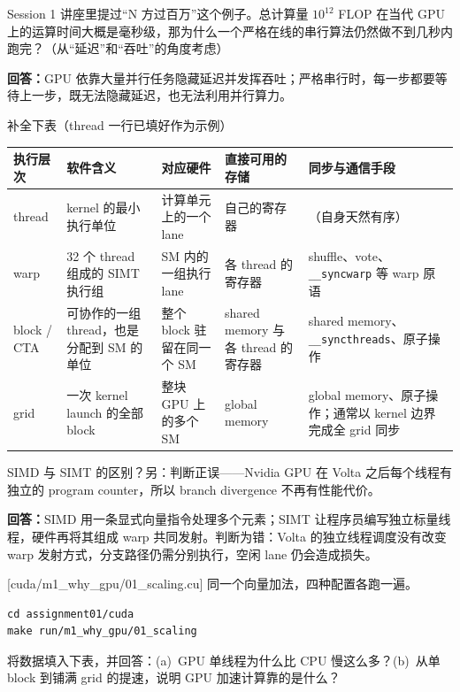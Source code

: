 \documentclass[11pt,a4paper,fontset=windows]{ctexart}
\begin{document}
Session 1 讲座里提过“N 方过百万”这个例子。总计算量 $10^{12}$ FLOP 在当代 GPU 上的运算时间大概是毫秒级，那为什么一个严格在线的串行算法仍然做不到几秒内跑完？（从“延迟”和“吞吐”的角度考虑）

\par\textbf{回答：}GPU 依靠大量并行任务隐藏延迟并发挥吞吐；严格串行时，每一步都要等待上一步，既无法隐藏延迟，也无法利用并行算力。

补全下表（thread 一行已填好作为示例）

\begin{center}\small
\begin{tabular}{@{}p{5.2em}p{9em}p{7.5em}p{7.5em}p{8em}@{}}
\toprule
执行层次 & 软件含义 & 对应硬件 & 直接可用的存储 & 同步与通信手段 \\
\midrule
thread & kernel 的最小执行单位 & 计算单元上的一个 lane & 自己的寄存器 & （自身天然有序） \\
warp & 32 个 thread 组成的 SIMT 执行组 & SM 内的一组执行 lane & 各 thread 的寄存器 & shuffle、vote、\texttt{\_\_syncwarp} 等 warp 原语 \\
block / CTA & 可协作的一组 thread，也是分配到 SM 的单位 & 整个 block 驻留在同一个 SM & shared memory 与各 thread 的寄存器 & shared memory、\texttt{\_\_syncthreads}、原子操作 \\
grid & 一次 kernel launch 的全部 block & 整块 GPU 上的多个 SM & global memory & global memory、原子操作；通常以 kernel 边界完成全 grid 同步 \\
\bottomrule
\end{tabular}
\end{center}

SIMD 与 SIMT 的区别？另：判断正误——Nvidia GPU 在 Volta 之后每个线程有独立的 program counter，所以 branch divergence 不再有性能代价。

\par\textbf{回答：}SIMD 用一条显式向量指令处理多个元素；SIMT 让程序员编写独立标量线程，硬件再将其组成 warp 共同发射。判断为错：Volta 的独立线程调度没有改变 warp 发射方式，分支路径仍需分别执行，空闲 lane 仍会造成损失。

[cuda/m1\_why\_gpu/01\_scaling.cu]
同一个向量加法，四种配置各跑一遍。

\begin{lstlisting}
cd assignment01/cuda
make run/m1_why_gpu/01_scaling
\end{lstlisting}

将数据填入下表，并回答：(a)~GPU 单线程为什么比 CPU 慢这么多？(b)~从单 block 到铺满 grid 的提速，说明 GPU 加速计算靠的是什么？
\end{document}
